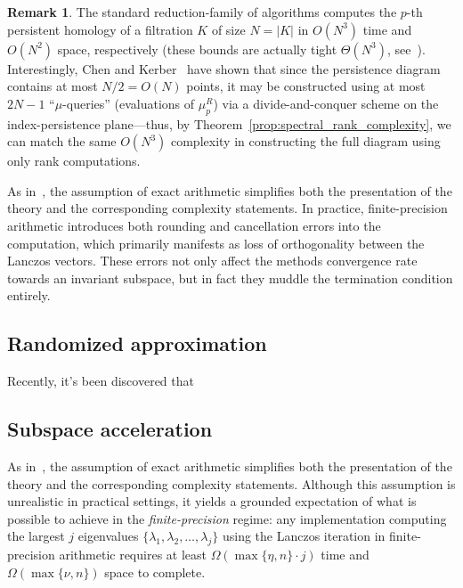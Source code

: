 \documentclass[10pt]{article}
\numberwithin{equation}{section}
\newcommand{\+}{%
	\raisebox{0.18ex}{\scaleobj{0.55}{+}}
}
\theoremstyle{definition}
\newtheorem{remark}{Remark}
\theoremstyle{definition}
\begin{document}
\begin{remark}
	The standard reduction-family of algorithms computes the $p$-th persistent homology of a filtration $K$ of size $N = \lvert K \rvert$ in $O(N^3)$ time and $O(N^2)$ space, respectively (these bounds are actually tight $\Theta(N^3)$, see~\cite{}). 
	Interestingly, Chen and Kerber~\cite{chen2011output} have shown that since the persistence diagram contains at most $N/2 = O(N)$ points, it may be constructed using at most $2N - 1$ ``$\mu$-queries'' (evaluations of $\mu_p^R$) via a divide-and-conquer scheme on the index-persistence plane---thus, by Theorem~\ref{prop:spectral_rank_complexity}, we can match the same $O(N^3)$ complexity in constructing the full diagram using only rank computations.  
\end{remark}
\noindent As in~\cite{parlett1994we}, the assumption of exact arithmetic simplifies both the presentation of the theory and the corresponding complexity statements. In practice, finite-precision arithmetic introduces both rounding and cancellation errors into the computation, which primarily manifests as loss of orthogonality between the Lanczos vectors. These errors not only affect the methods convergence rate towards an invariant subspace, but in fact they muddle the termination condition entirely. 

\subsection*{Randomized approximation}
Recently, it's been discovered that 



\subsection*{Subspace acceleration}
\noindent As in~\cite{parlett1994we}, the assumption of exact arithmetic simplifies both the presentation of the theory and the corresponding complexity statements. 
Although this assumption is unrealistic in practical settings, it yields a grounded expectation of what is possible to achieve in the \emph{finite-precision} regime: any implementation computing the largest $j$ eigenvalues $\{ \lambda_1, \lambda_2, \dots, \lambda_j \}$ using the Lanczos iteration in finite-precision arithmetic requires at least $\Omega(\max\{\eta, n\} \cdot j)$ time and $\Omega(\max\{\nu, n\})$ space to complete. 
\end{document}
